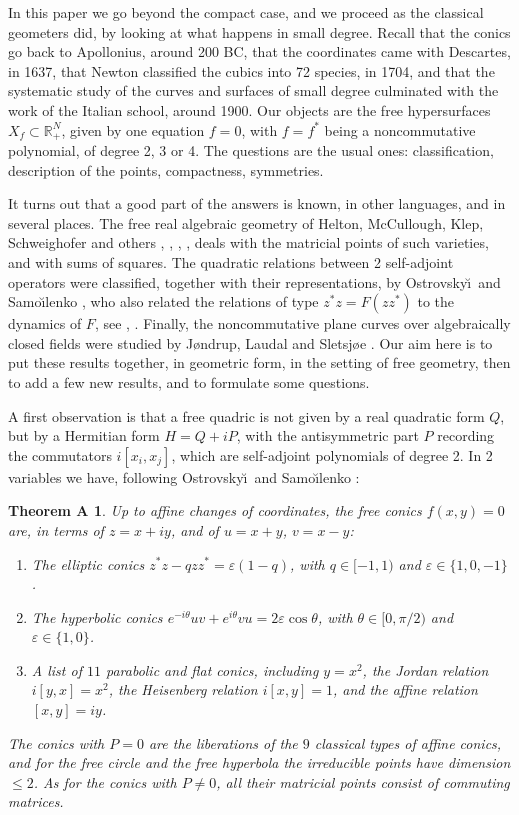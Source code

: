 \documentclass[11pt]{amsart}
\newtheorem*{theorema}{Theorem A}
\theoremstyle{definition}
\begin{document}
In this paper we go beyond the compact case, and we proceed as the classical geometers did, by looking at what happens in small degree. Recall that the conics go back to Apollonius, around 200 BC, that the coordinates came with Descartes, in 1637, that Newton classified the cubics into 72 species, in 1704, and that the systematic study of the curves and surfaces of small degree culminated with the work of the Italian school, around 1900. Our objects are the free hypersurfaces $X_f\subset\mathbb R^N_+$, given by one equation $f=0$, with $f=f^*$ being a noncommutative polynomial, of degree 2, 3 or 4. The questions are the usual ones: classification, description of the points, compactness, symmetries.

It turns out that a good part of the answers is known, in other languages, and in several places. The free real algebraic geometry of Helton, McCullough, Klep, Schweighofer and others \cite{chm}, \cite{hel}, \cite{hkm}, \cite{hm1}, \cite{ksc} deals with the matricial points of such varieties, and with sums of squares. The quadratic relations between 2 self-adjoint operators were classified, together with their representations, by Ostrovsky\u\i\ and Samo\u\i lenko \cite{os1}, who also related the relations of type $z^*z=F(zz^*)$ to the dynamics of $F$, see \cite{os1}, \cite{os2}. Finally, the noncommutative plane curves over algebraically closed fields were studied by J\o ndrup, Laudal and Sletsj\o e \cite{jls}. Our aim here is to put these results together, in geometric form, in the setting of free geometry, then to add a few new results, and to formulate some questions.

A first observation is that a free quadric is not given by a real quadratic form $Q$, but by a Hermitian form $H=Q+iP$, with the antisymmetric part $P$ recording the commutators $i[x_i,x_j]$, which are self-adjoint polynomials of degree 2. In 2 variables we have, following Ostrovsky\u\i\ and Samo\u\i lenko \cite{os1}:

\begin{theorema}
Up to affine changes of coordinates, the free conics $f(x,y)=0$ are, in terms of $z=x+iy$, and of $u=x+y$, $v=x-y$:
\begin{enumerate}
\item The elliptic conics $z^*z-qzz^*=\varepsilon(1-q)$, with $q\in[-1,1)$ and $\varepsilon\in\{1,0,-1\}$.

\item The hyperbolic conics $e^{-i\theta}uv+e^{i\theta}vu=2\varepsilon\cos\theta$, with $\theta\in[0,\pi/2)$ and $\varepsilon\in\{1,0\}$.

\item A list of $11$ parabolic and flat conics, including $y=x^2$, the Jordan relation $i[y,x]=x^2$, the Heisenberg relation $i[x,y]=1$, and the affine relation $[x,y]=iy$.
\end{enumerate}
The conics with $P=0$ are the liberations of the $9$ classical types of affine conics, and for the free circle and the free hyperbola the irreducible points have dimension $\leq2$. As for the conics with $P\neq0$, all their matricial points consist of commuting matrices.
\end{theorema}
\end{document}
